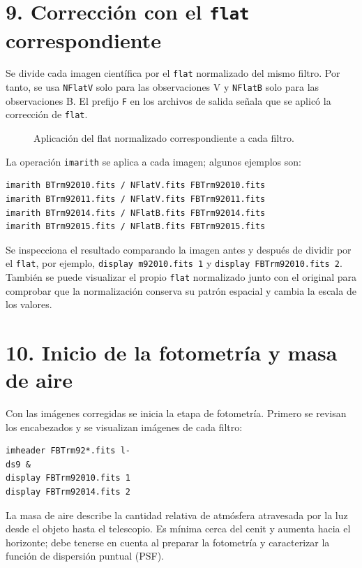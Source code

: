 \documentclass[11pt,twocolumn]{article}
\newcommand{\widefigure}[2]{\begin{figure}[!t]\centering\caption{#2}\end{figure}}
\begin{document}
\section*{9. Corrección con el \texttt{flat} correspondiente}

Se divide cada imagen científica por el \texttt{flat} normalizado del mismo
filtro. Por tanto, se usa \texttt{NFlatV} solo para las observaciones V y
\texttt{NFlatB} solo para las observaciones B. El prefijo \texttt{F} en los
archivos de salida señala que se aplicó la corrección de \texttt{flat}.

\widefigure{figuras/correccion_filtros.tex}{Aplicación del flat normalizado correspondiente a cada filtro.}

La operación \texttt{imarith} se aplica a cada imagen; algunos ejemplos son:

\begin{verbatim}
imarith BTrm92010.fits / NFlatV.fits FBTrm92010.fits
imarith BTrm92011.fits / NFlatV.fits FBTrm92011.fits
imarith BTrm92014.fits / NFlatB.fits FBTrm92014.fits
imarith BTrm92015.fits / NFlatB.fits FBTrm92015.fits
\end{verbatim}

Se inspecciona el resultado comparando la imagen antes y después de dividir por
el \texttt{flat}, por ejemplo, \texttt{display m92010.fits 1} y
\texttt{display FBTrm92010.fits 2}. También se puede visualizar el propio
\texttt{flat} normalizado junto con el original para comprobar que la
normalización conserva su patrón espacial y cambia la escala de los valores.

\section*{10. Inicio de la fotometría y masa de aire}

Con las imágenes corregidas se inicia la etapa de fotometría. Primero se
revisan los encabezados y se visualizan imágenes de cada filtro:

\begin{verbatim}
imheader FBTrm92*.fits l-
ds9 &
display FBTrm92010.fits 1
display FBTrm92014.fits 2
\end{verbatim}

La masa de aire describe la cantidad relativa de atmósfera atravesada por la
luz desde el objeto hasta el telescopio. Es mínima cerca del cenit y aumenta
hacia el horizonte; debe tenerse en cuenta al preparar la fotometría y
caracterizar la función de dispersión puntual (PSF).
\end{document}
